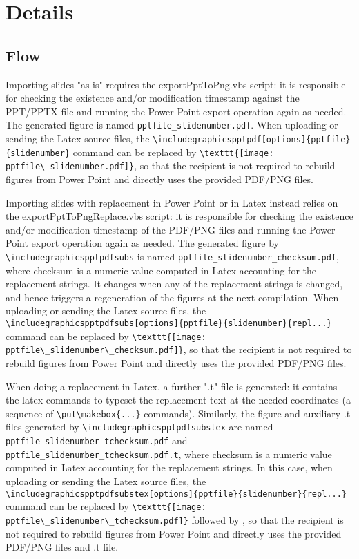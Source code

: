 \documentclass[10pt,,a4paper]{article}
\begin{document}
\section{Details}
\subsection{Flow}
Importing slides "as-is" requires the exportPptToPng.vbs script: it is responsible for checking the existence and/or modification timestamp against the PPT/PPTX file and running the Power Point export operation again as needed.
The generated figure is named \verb!pptfile_slidenumber.pdf!.
When uploading or sending the Latex source files, the \verb!\includegraphicspptpdf[options]{pptfile}{slidenumber}! command can be replaced by \verb!\texttt{[image: pptfile\_slidenumber.pdf]}!, so that the recipient is not required to rebuild figures from Power Point and directly uses the provided PDF/PNG files.


Importing slides with replacement in Power Point or in Latex instead relies on the exportPptToPngReplace.vbs script: it is responsible for checking the existence and/or modification timestamp of the PDF/PNG files and running the Power Point export operation again as needed.
The generated figure by \verb!\includegraphicspptpdfsubs! is named \verb!pptfile_slidenumber_checksum.pdf!, where checksum is a numeric value computed in Latex accounting for the replacement strings. 
It changes when any of the replacement strings is changed, and hence triggers a regeneration of the figures at the next compilation.
When uploading or sending the Latex source files, the \verb!\includegraphicspptpdfsubs[options]{pptfile}{slidenumber}{repl...}! command can be replaced by \verb!\texttt{[image: pptfile\_slidenumber\_checksum.pdf]}!, so that the recipient is not required to rebuild figures from Power Point and directly uses the provided PDF/PNG files.

When doing a replacement in Latex, a further ".t" file is generated: it contains the latex commands to typeset the replacement text at the needed coordinates (a sequence of \verb!\put\makebox{...}! commands).
Similarly, the figure and auxiliary .t files generated by \verb!\includegraphicspptpdfsubstex! are named \verb!pptfile_slidenumber_tchecksum.pdf! and \verb!pptfile_slidenumber_tchecksum.pdf.t!, where checksum is a numeric value computed in Latex accounting for the replacement strings. 
In this case, when uploading or sending the Latex source files, the \verb!\includegraphicspptpdfsubstex[options]{pptfile}{slidenumber}{repl...}! command can be replaced by \verb!\texttt{[image: pptfile\_slidenumber\_tchecksum.pdf]}! followed by \verb!!, so that the recipient is not required to rebuild figures from Power Point and directly uses the provided PDF/PNG files and .t file.
\end{document}
